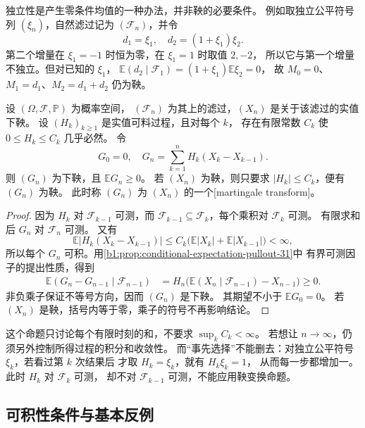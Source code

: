 \ProseParagraphBreak

独立性是产生零条件均值的一种办法，并非鞅的必要条件。
例如取独立公平符号列 \((\xi_n)\)，自然滤过记为 \((\mathcal F_n)\)，并令
\[
 d_1=\xi_1,\quad d_2=(1+\xi_1)\xi_2.
\]
第二个增量在 \(\xi_1=-1\) 时恒为零，在 \(\xi_1=1\) 时取值 \(2,-2\)，
所以它与第一个增量不独立。但对已知的 \(\xi_1\)，
\(\mathbb E(d_2\mid\mathcal F_1)=(1+\xi_1)\mathbb E\xi_2=0\)，
故 \(M_0=0\)、\(M_1=d_1\)、\(M_2=d_1+d_2\) 仍为鞅。

\begin{proposition}[有界可料乘子与鞅变换]
\label{b1:prop:martingale-transform-31}
设 \((\Omega,\mathcal F,\mathbb P)\) 为概率空间，
\((\mathcal F_n)\) 为其上的滤过，\((X_n)\) 是关于该滤过的实值下鞅。
设 \((H_k)_{k\geq1}\) 是实值可料过程，且对每个 \(k\)，
存在有限常数 \(C_k\) 使 \(0\leq H_k\leq C_k\) 几乎必然。
令
\[
 G_0=0,\quad G_n=\sum_{k=1}^nH_k(X_k-X_{k-1}).
\]
则 \((G_n)\) 为下鞅，且 \(\mathbb E G_n\geq0\)。
若 \((X_n)\) 为鞅，则只要求 \(|H_k|\leq C_k\)，便有 \((G_n)\) 为鞅。
此时称 \((G_n)\) 为 \((X_n)\) 的一个[martingale transform]。
\end{proposition}
\begin{proof}
因为 \(H_k\) 对 \(\mathcal F_{k-1}\) 可测，而
\(\mathcal F_{k-1}\subseteq\mathcal F_k\)，每个乘积对 \(\mathcal F_k\) 可测。
有限求和后 \(G_n\) 对 \(\mathcal F_n\) 可测。
又有
\[
 \mathbb E\bigl|H_k(X_k-X_{k-1})\bigr|
 \leq C_k\bigl(\mathbb E|X_k|+\mathbb E|X_{k-1}|\bigr)<\infty,
\]
所以每个 \(G_n\) 可积。用\cref{b1:prop:conditional-expectation-pullout-31}中
有界可测因子的提出性质，得到
\[
 \begin{aligned}
 \mathbb E(G_n-G_{n-1}\mid\mathcal F_{n-1})
 &=H_n\bigl(\mathbb E(X_n\mid\mathcal F_{n-1})-X_{n-1}\bigr)\geq0.
 \end{aligned}
\]
非负乘子保证不等号方向，因而 \((G_n)\) 是下鞅。
其期望不小于 \(\mathbb E G_0=0\)。
若 \((X_n)\) 是鞅，括号内等于零，乘子的符号不再影响结论。
\end{proof}

这个命题只讨论每个有限时刻的和，不要求 \(\sup_k C_k<\infty\)。
若想让 \(n\to\infty\)，仍须另外控制所得过程的积分和收敛性。
而“事先选择”不能删去：对独立公平符号 \(\xi_k\)，若看过第 \(k\) 次结果后
才取 \(H_k=\xi_k\)，就有 \(H_k\xi_k=1\)，
从而每一步都增加一。此时 \(H_k\) 对 \(\mathcal F_k\) 可测，
却不对 \(\mathcal F_{k-1}\) 可测，不能应用鞅变换命题。

\subsection{可积性条件与基本反例}
\label{b1:subsec:310304}

